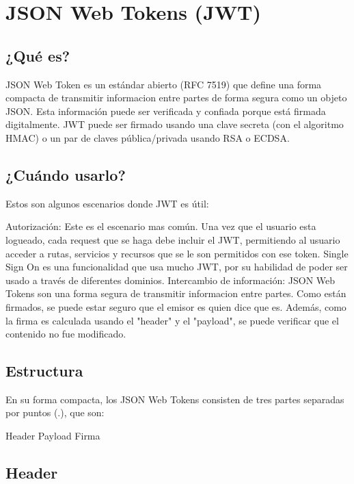 \section[JSON Web Tokens (JWT)]{JSON Web Tokens (JWT)}
\subsection[¿Qué es?]{¿Qué es?}

JSON Web Token es un estándar abierto (RFC 7519) que define una forma compacta de transmitir informacion entre partes de forma segura como un objeto JSON. Esta información puede ser verificada y confiada porque está firmada digitalmente. JWT puede ser firmado usando una clave secreta (con el algoritmo HMAC) o un par de claves pública/privada usando RSA o ECDSA.


\subsection[¿Cuándo usarlo?]{¿Cuándo usarlo?}

Estos son algunos escenarios donde JWT es útil:
\begin{outline}
    \1 Autorización: Este es el escenario mas común. Una vez que el usuario esta logueado, cada request que se haga debe incluir el JWT, permitiendo al usuario acceder a rutas, servicios y recursos que se le son permitidos con ese token. Single Sign On es una funcionalidad que usa mucho JWT, por su habilidad de poder ser usado a través de diferentes dominios.
    \1 Intercambio de información: JSON Web Tokens son una forma segura de transmitir informacion entre partes. Como están firmados, se puede estar seguro que el emisor es quien dice que es. Además, como la firma es calculada usando el "header" y el "payload", se puede verificar que el contenido no fue modificado.
\end{outline}
\subsection[Estructura]{Estructura}


En su forma compacta, los JSON Web Tokens consisten de tres partes separadas por puntos (.), que son:
\begin{outline}
    \2 Header
    \2 Payload
    \2 Firma
\end{outline}

\subsection[Header]{Header}

